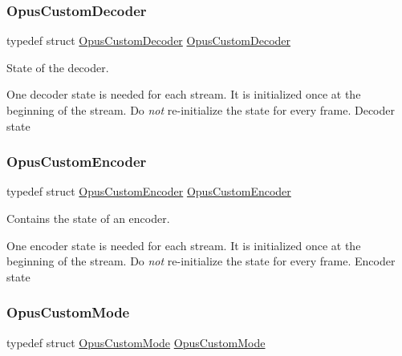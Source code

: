 \subsubsection{\texorpdfstring{Opus\+Custom\+Decoder}{OpusCustomDecoder}}
{\footnotesize\ttfamily typedef struct \hyperlink{group__opus__custom_gacae60f89c5ce7aeea69503451b9e2e6f}{Opus\+Custom\+Decoder} \hyperlink{group__opus__custom_gacae60f89c5ce7aeea69503451b9e2e6f}{Opus\+Custom\+Decoder}}



State of the decoder. 

One decoder state is needed for each stream. It is initialized once at the beginning of the stream. Do {\itshape not} re-\/initialize the state for every frame. Decoder state \mbox{\label{group__opus__custom_ga7abe6a7afc599667950251c987feb439}} 
\subsubsection{\texorpdfstring{Opus\+Custom\+Encoder}{OpusCustomEncoder}}
{\footnotesize\ttfamily typedef struct \hyperlink{group__opus__custom_ga7abe6a7afc599667950251c987feb439}{Opus\+Custom\+Encoder} \hyperlink{group__opus__custom_ga7abe6a7afc599667950251c987feb439}{Opus\+Custom\+Encoder}}



Contains the state of an encoder. 

One encoder state is needed for each stream. It is initialized once at the beginning of the stream. Do {\itshape not} re-\/initialize the state for every frame. Encoder state \mbox{\label{group__opus__custom_gaf33847c711195b9edef896b73c96ec4f}} 
\subsubsection{\texorpdfstring{Opus\+Custom\+Mode}{OpusCustomMode}}
{\footnotesize\ttfamily typedef struct \hyperlink{group__opus__custom_gaf33847c711195b9edef896b73c96ec4f}{Opus\+Custom\+Mode} \hyperlink{group__opus__custom_gaf33847c711195b9edef896b73c96ec4f}{Opus\+Custom\+Mode}}



